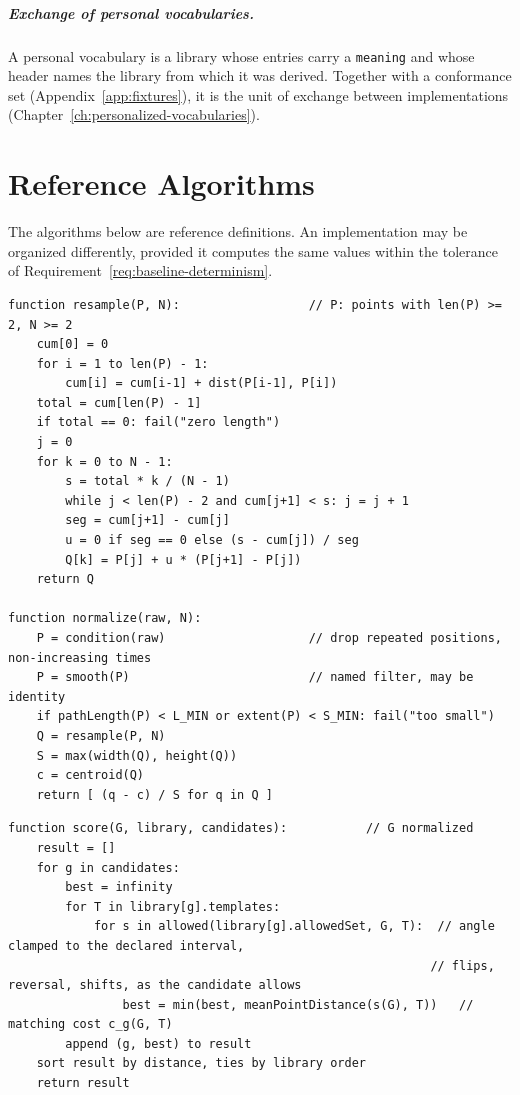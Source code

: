 \paragraph{Exchange of personal vocabularies.} A personal vocabulary is a library whose entries carry a \texttt{meaning} and whose header names the library from which it was derived. Together with a conformance set (Appendix~\ref{app:fixtures}), it is the unit of exchange between implementations (Chapter~\ref{ch:personalized-vocabularies}).

\chapter{Reference Algorithms}\label{app:algorithms}

The algorithms below are reference definitions. An implementation may be organized differently, provided it computes the same values within the tolerance of Requirement~\ref{req:baseline-determinism}.

\begin{lstlisting}[language=Pseudo,caption={Arc-length resampling and normalization.},label={lst:resample}]
function resample(P, N):                  // P: points with len(P) >= 2, N >= 2
    cum[0] = 0
    for i = 1 to len(P) - 1:
        cum[i] = cum[i-1] + dist(P[i-1], P[i])
    total = cum[len(P) - 1]
    if total == 0: fail("zero length")
    j = 0
    for k = 0 to N - 1:
        s = total * k / (N - 1)
        while j < len(P) - 2 and cum[j+1] < s: j = j + 1
        seg = cum[j+1] - cum[j]
        u = 0 if seg == 0 else (s - cum[j]) / seg
        Q[k] = P[j] + u * (P[j+1] - P[j])
    return Q

function normalize(raw, N):
    P = condition(raw)                    // drop repeated positions, non-increasing times
    P = smooth(P)                         // named filter, may be identity
    if pathLength(P) < L_MIN or extent(P) < S_MIN: fail("too small")
    Q = resample(P, N)
    S = max(width(Q), height(Q))
    c = centroid(Q)
    return [ (q - c) / S for q in Q ]
\end{lstlisting}

\begin{lstlisting}[language=Pseudo,caption={Template matching under an invariance group.},label={lst:match}]
function score(G, library, candidates):           // G normalized
    result = []
    for g in candidates:
        best = infinity
        for T in library[g].templates:
            for s in allowed(library[g].allowedSet, G, T):  // angle clamped to the declared interval,
                                                           // flips, reversal, shifts, as the candidate allows
                best = min(best, meanPointDistance(s(G), T))   // matching cost c_g(G, T)
        append (g, best) to result
    sort result by distance, ties by library order
    return result
\end{lstlisting}

